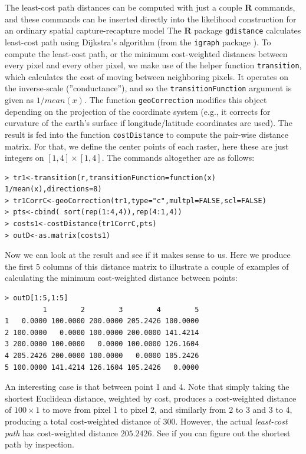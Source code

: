 The least-cost path distances can be
computed with just a couple {\bf R} commands, and these commands can
be inserted directly into the likelihood construction for an ordinary
spatial capture-recapture model The {\bf R} package
\mbox{\tt gdistance} calculates least-cost path using  Dijkstra's algorithm
\citep{dijkstra:1959} (from the \mbox{\tt igraph} package
\citep{csardi:2010}).
To compute the least-cost path, or the minimum cost-weighted distances
between every pixel and every other pixel, we make use of the helper
function \mbox{\tt transition}, which calculates the cost of moving
between neighboring pixels.  It operates on the inverse-scale
(''conductance''), and so the \mbox{\tt transitionFunction} argument
is given as $1/mean(x)$.  The function \mbox{\tt geoCorrection}
modifies this object depending on the projection of the coordinate
system (e.g., it corrects for curvature of the earth's surface if
longitude/latitude coordinates are used).  The result is fed into the
function \mbox{\tt costDistance} to compute the pair-wise distance
matrix. For that, we define the center points of each raster, here
these are just integers on $[1,4] \times [1,4]$.  The commands
altogether are as follows: {\small
\begin{verbatim}
> tr1<-transition(r,transitionFunction=function(x) 1/mean(x),directions=8)
> tr1CorrC<-geoCorrection(tr1,type="c",multpl=FALSE,scl=FALSE)
> pts<-cbind( sort(rep(1:4,4)),rep(4:1,4))
> costs1<-costDistance(tr1CorrC,pts)
> outD<-as.matrix(costs1)
\end{verbatim}
}
Now we can look at the result and see if it makes sense to us. Here we
produce the first 5 columns of this distance matrix to illustrate a
couple of examples of calculating the minimum cost-weighted distance
between points:
\begin{center}
{\small
\begin{verbatim}
> outD[1:5,1:5]
         1        2        3        4        5
1   0.0000 100.0000 200.0000 205.2426 100.0000
2 100.0000   0.0000 100.0000 200.0000 141.4214
3 200.0000 100.0000   0.0000 100.0000 126.1604
4 205.2426 200.0000 100.0000   0.0000 105.2426
5 100.0000 141.4214 126.1604 105.2426   0.0000
\end{verbatim}
}
\end{center}
An interesting case is that between point 1 and 4. Note that simply
taking the shortest Euclidean distance, weighted by cost, produces a
cost-weighted distance of $100 \times 1$ to move from pixel 1 to pixel
2, and similarly from 2 to 3 and 3 to 4, producing a total
cost-weighted distance of $300$. However, the actual {\it least-cost
  path} has cost-weighted distance $205.2426$. See if you can figure
out the shortest path by inspection.

